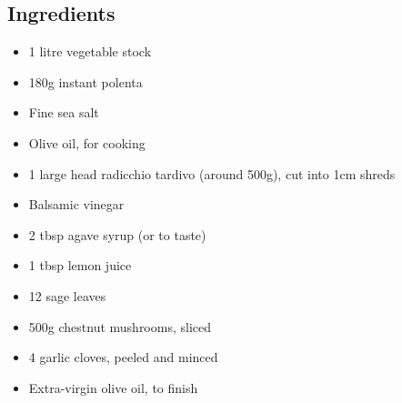 \documentclass{book}
\begin{document}
\subsection*{Ingredients}
\begin{itemize}
\item 1 litre vegetable stock
\item 180g instant polenta
\item Fine sea salt
\item Olive oil, for cooking
\item 1 large head radicchio tardivo (around 500g), cut into 1cm shreds
\item Balsamic vinegar
\item 2 tbsp agave syrup (or to taste)
\item 1 tbsp lemon juice
\item 12 sage leaves
\item 500g chestnut mushrooms, sliced
\item 4 garlic cloves, peeled and minced
\item Extra-virgin olive oil, to finish
\end{itemize}
\end{document}
